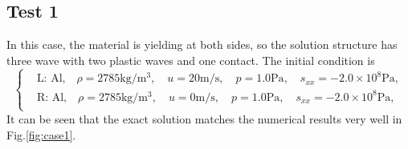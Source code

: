 \documentclass{article}
\numberwithin{equation}{section}
\numberwithin{table}{section}
\begin{document}
\subsection{Test 1}
In this case, the material is yielding at both sides, so the solution structure has three wave with two plastic waves and one contact.
The initial condition is
\begin{equation}
 \left\{ \begin{aligned}
&	 \text{L: Al,}\quad  \rho = 2785 \text{kg}/\text{m}^3, \quad  u = 20\text{m}/\text{s}, \quad  p = 1.0\text{Pa}, \quad  s_{xx}=-2.0\times 10^8 \text{Pa},\\
&	 \text{R: Al,}\quad  \rho = 2785 \text{kg}/\text{m}^3, \quad  u = 0\text{m}/\text{s}, \quad  p = 1.0\text{Pa}, \quad  s_{xx}=-2.0\times 10^8 \text{Pa},\\
   \end{aligned}
 \right.
\end{equation}
It can be seen that the exact solution matches the numerical results very well in Fig.\ref{fig:case1}.
\end{document}
